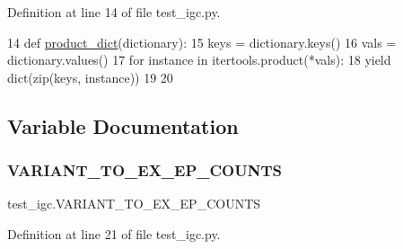Definition at line 14 of file test\+\_\+igc.\+py.


\begin{DoxyCode}
14 \textcolor{keyword}{def }\hyperlink{namespacetest__igc_a8bd3155f9accc82ab841ba66f2bbfae0}{product\_dict}(dictionary):
15     keys = dictionary.keys()
16     vals = dictionary.values()
17     \textcolor{keywordflow}{for} instance \textcolor{keywordflow}{in} itertools.product(*vals):
18         \textcolor{keywordflow}{yield} dict(zip(keys, instance))
19 
20 
\end{DoxyCode}


\subsection{Variable Documentation}
\mbox{\label{namespacetest__igc_aeef6b39d3c9b65fdbd80f2feea7bf0c0}} 
\subsubsection{\texorpdfstring{V\+A\+R\+I\+A\+N\+T\+\_\+\+T\+O\+\_\+\+E\+X\+\_\+\+E\+P\+\_\+\+C\+O\+U\+N\+TS}{VARIANT\_TO\_EX\_EP\_COUNTS}}
{\footnotesize\ttfamily test\+\_\+igc.\+V\+A\+R\+I\+A\+N\+T\+\_\+\+T\+O\+\_\+\+E\+X\+\_\+\+E\+P\+\_\+\+C\+O\+U\+N\+TS}



Definition at line 21 of file test\+\_\+igc.\+py.


